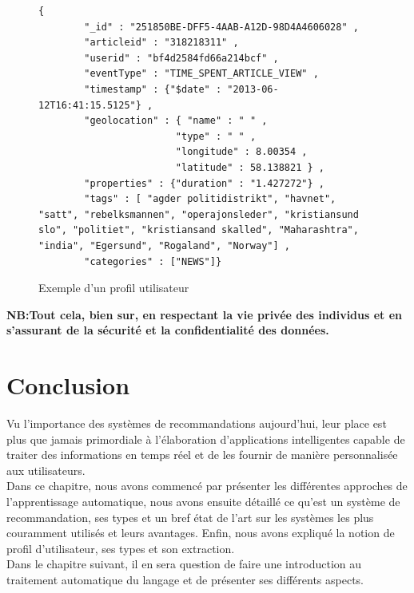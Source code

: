     \begin{figure}[H]
    \begin{lstlisting}[style=code]
        {
        "_id" : "251850BE-DFF5-4AAB-A12D-98D4A4606028" ,
        "articleid" : "318218311" ,
        "userid" : "bf4d2584fd66a214bcf" ,
        "eventType" : "TIME_SPENT_ARTICLE_VIEW" ,
        "timestamp" : {"$date" : "2013-06-12T16:41:15.5125"} ,
        "geolocation" : { "name" : " " ,
                        "type" : " " ,
                        "longitude" : 8.00354 ,
                        "latitude" : 58.138821 } ,
        "properties" : {"duration" : "1.427272"} ,
        "tags" : [ "agder politidistrikt", "havnet", "satt", "rebelksmannen", "operajonsleder", "kristiansund slo", "politiet", "kristiansand skalled", "Maharashtra", "india", "Egersund", "Rogaland", "Norway"] ,
        "categories" : ["NEWS"]}
    \end{lstlisting}
    \caption{Exemple d'un profil utilisateur}\cite{refnorvege}
    \end{figure}

    \textbf{NB:Tout cela, bien sur, en respectant la vie privée des individus et en s'assurant de la sécurité et la confidentialité des données.}


\section{Conclusion}
Vu l'importance des systèmes de recommandations aujourd'hui, leur place est plus que jamais primordiale à l'élaboration d'applications intelligentes capable de traiter des informations en temps réel et de les fournir de manière personnalisée aux utilisateurs.\\
Dans ce chapitre, nous avons commencé par présenter les différentes approches de l'apprentissage automatique, nous avons ensuite détaillé ce qu'est un système de recommandation, ses types et un bref état de l'art sur les systèmes les plus couramment utilisés et leurs avantages. Enfin, nous avons expliqué la notion de profil d'utilisateur, ses types et son extraction.\\ 
Dans le chapitre suivant, il en sera question de faire une introduction au traitement automatique du langage et de présenter ses différents aspects.